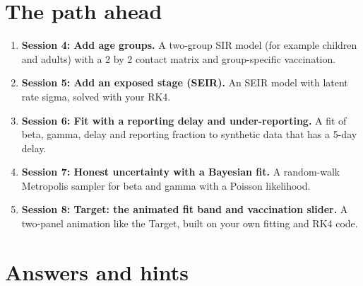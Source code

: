 \documentclass[11pt,a4paper]{article}
\begin{document}
\section{The path ahead}
\begin{enumerate}[nosep]
\item \textbf{Session 4: Add age groups.} A two-group SIR model (for example children and adults) with a 2 by 2 contact matrix and group-specific vaccination.
\item \textbf{Session 5: Add an exposed stage (SEIR).} An SEIR model with latent rate sigma, solved with your RK4.
\item \textbf{Session 6: Fit with a reporting delay and under-reporting.} A fit of beta, gamma, delay and reporting fraction to synthetic data that has a 5-day delay.
\item \textbf{Session 7: Honest uncertainty with a Bayesian fit.} A random-walk Metropolis sampler for beta and gamma with a Poisson likelihood.
\item \textbf{Session 8: Target: the animated fit band and vaccination slider.} A two-panel animation like the Target, built on your own fitting and RK4 code.
\end{enumerate}

\section{Answers and hints}
\end{document}
